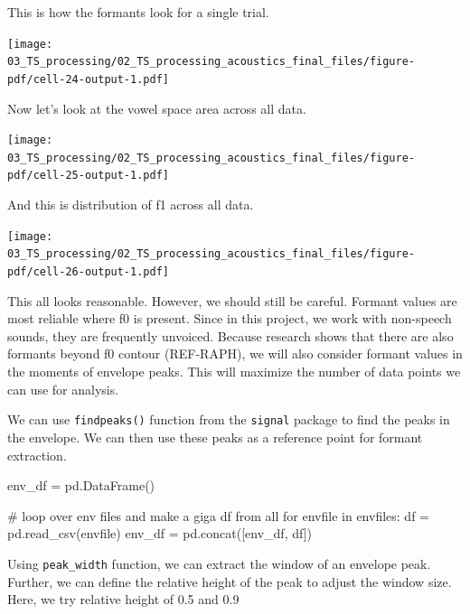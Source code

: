 \documentclass[
  letterpaper,
  DIV=11,
  numbers=noendperiod]{scrreprt}
\newenvironment{Shaded}{\begin{snugshade}}{\end{snugshade}}
\newcommand{\CommentTok}[1]{\textcolor[rgb]{0.37,0.37,0.37}{#1}}
\newcommand{\ControlFlowTok}[1]{\textcolor[rgb]{0.00,0.23,0.31}{#1}}
\newcommand{\KeywordTok}[1]{\textcolor[rgb]{0.00,0.23,0.31}{#1}}
\newcommand{\NormalTok}[1]{\textcolor[rgb]{0.00,0.23,0.31}{#1}}
\newcommand{\OperatorTok}[1]{\textcolor[rgb]{0.37,0.37,0.37}{#1}}
\begin{document}
This is how the formants look for a single trial.

\texttt{[image: 03\_TS\_processing/02\_TS\_processing\_acoustics\_final\_files/figure-pdf/cell-24-output-1.pdf]}

Now let's look at the vowel space area across all data.

\texttt{[image: 03\_TS\_processing/02\_TS\_processing\_acoustics\_final\_files/figure-pdf/cell-25-output-1.pdf]}

And this is distribution of f1 across all data.

\texttt{[image: 03\_TS\_processing/02\_TS\_processing\_acoustics\_final\_files/figure-pdf/cell-26-output-1.pdf]}

This all looks reasonable. However, we should still be careful. Formant
values are most reliable where f0 is present. Since in this project, we
work with non-speech sounds, they are frequently unvoiced. Because
research shows that there are also formants beyond f0 contour
(REF-RAPH), we will also consider formant values in the moments of
envelope peaks. This will maximize the number of data points we can use
for analysis.

We can use \texttt{findpeaks()} function from the \texttt{signal}
package to find the peaks in the envelope. We can then use these peaks
as a reference point for formant extraction.

\begin{Shaded}
\begin{Highlighting}[]
\NormalTok{env\_df }\OperatorTok{=}\NormalTok{ pd.DataFrame()}

\CommentTok{\# loop over env files and make a giga df from all}
\ControlFlowTok{for}\NormalTok{ envfile }\KeywordTok{in}\NormalTok{ envfiles:}
\NormalTok{    df }\OperatorTok{=}\NormalTok{ pd.read\_csv(envfile)}
\NormalTok{    env\_df }\OperatorTok{=}\NormalTok{ pd.concat([env\_df, df])}
\end{Highlighting}
\end{Shaded}

Using \texttt{peak\_width} function, we can extract the window of an
envelope peak. Further, we can define the relative height of the peak to
adjust the window size. Here, we try relative height of 0.5 and 0.9
\end{document}
